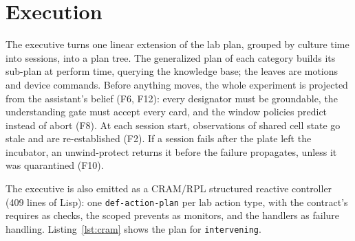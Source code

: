 \documentclass[10pt,a4paper]{article}
\begin{document}
\section{Execution}\label{sec:exec}

The executive turns one linear extension of the lab plan, grouped by culture time into sessions, into a plan tree. The generalized plan of each category builds its sub-plan at perform time, querying the knowledge base; the leaves are motions and device commands. Before anything moves, the whole experiment is projected from the assistant's belief (F6, F12): every designator must be groundable, the understanding gate must accept every card, and the window policies predict instead of abort (F8). At each session start, observations of shared cell state go stale and are re-established (F2). If a session fails after the plate left the incubator, an unwind-protect returns it before the failure propagates, unless it was quarantined (F10).

The executive is also emitted as a CRAM/RPL structured reactive controller (409 lines of Lisp): one \texttt{def-\allowbreak{}action-\allowbreak{}plan} per lab action type, with the contract's requires as checks, the scoped prevents as monitors, and the handlers as failure handling. Listing~\ref{lst:cram} shows the plan for \texttt{intervening}.
\end{document}

